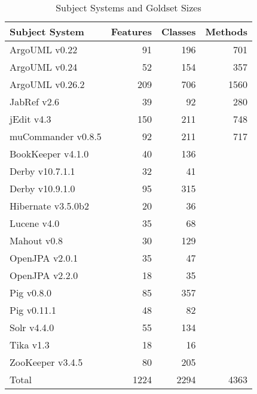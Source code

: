 \begin{table}[h]
\renewcommand{\arraystretch}{1.3}
\footnotesize
\centering
\caption{Subject Systems and Goldset Sizes}
\begin{tabular}{lrrr}
    \toprule
    Subject System      & Features  & Classes   & Methods \\
    \midrule
    ArgoUML v0.22       & 91        & 196       & 701   \\
    ArgoUML v0.24       & 52        & 154       & 357   \\
    ArgoUML v0.26.2     & 209       & 706       & 1560  \\
    JabRef v2.6         & 39        & 92        & 280   \\
    jEdit v4.3          & 150       & 211       & 748   \\
    muCommander v0.8.5  & 92        & 211       & 717   \\
    BookKeeper v4.1.0   & 40        & 136       &       \\
    Derby v10.7.1.1     & 32        & 41        &       \\
    Derby v10.9.1.0     & 95        & 315       &       \\
    Hibernate v3.5.0b2  & 20        & 36        &       \\
    Lucene v4.0         & 35        & 68        &       \\
    Mahout v0.8         & 30        & 129       &       \\
    OpenJPA v2.0.1      & 35        & 47        &       \\
    OpenJPA v2.2.0      & 18        & 35        &       \\
    Pig v0.8.0          & 85        & 357       &       \\
    Pig v0.11.1         & 48        & 82        &       \\
    Solr v4.4.0         & 55        & 134       &       \\
    Tika v1.3           & 18        & 16        &       \\
    ZooKeeper v3.4.5    & 80        & 205       &       \\
    \midrule
    Total               & 1224      & 2294      & 4363  \\
    \bottomrule
\end{tabular}
\end{table}



